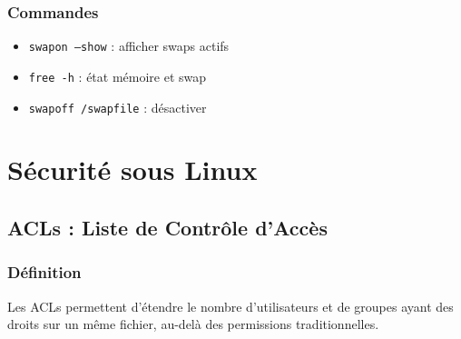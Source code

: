 \documentclass[12pt,a4paper]{article}
\begin{document}
\subsubsection{Commandes}
\begin{itemize}
    \item \texttt{swapon --show} : afficher swaps actifs
    \item \texttt{free -h} : \'etat m\'emoire et swap
    \item \texttt{swapoff /swapfile} : d\'esactiver
\end{itemize}


\section{S\'ecurit\'e sous Linux}


\subsection{ACLs : Liste de Contr\^ole d'Acc\`es}


\subsubsection{D\'efinition}
Les ACLs permettent d'\'etendre le nombre d'utilisateurs et de groupes ayant des droits sur un m\^eme fichier, au-del\`a des permissions traditionnelles.
\end{document}
